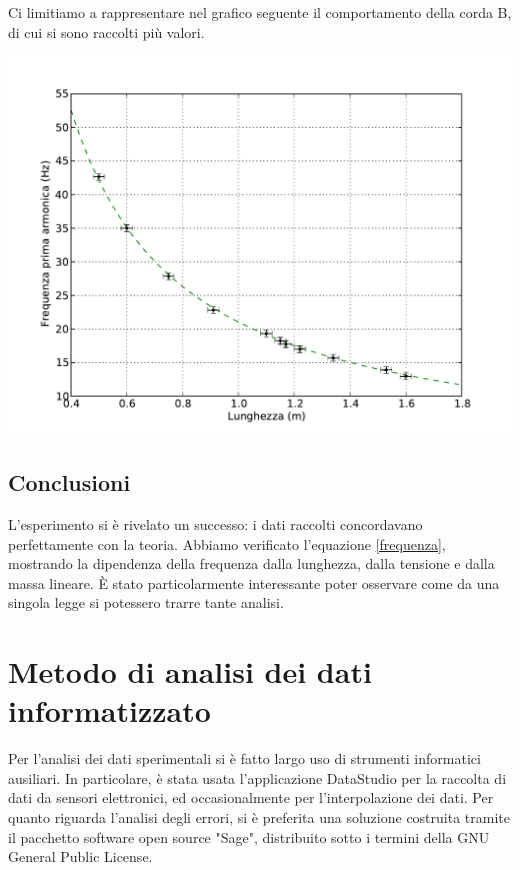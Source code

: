 Ci limitiamo a rappresentare nel grafico seguente il comportamento della corda B, di cui si sono raccolti più valori.

\begin{center}
\includegraphics[scale=0.75]{"../grafici/CordaPrimaArmonica"}
\end{center}

\section{Conclusioni}

L'esperimento si è rivelato un successo: i dati raccolti concordavano perfettamente con la teoria. Abbiamo verificato l'equazione \ref{frequenza}, mostrando la dipendenza della frequenza dalla lunghezza, dalla tensione e dalla massa lineare. È stato particolarmente interessante poter osservare come da una singola legge si potessero trarre tante analisi.




\addappheadtotoc
\appendix{}
\chapter{Metodo di analisi dei dati informatizzato}
Per l'analisi dei dati sperimentali si è fatto largo uso di strumenti informatici ausiliari.
In particolare, è stata usata l'applicazione DataStudio per la raccolta di dati da sensori elettronici, ed occasionalmente per l'interpolazione dei dati.
Per quanto riguarda l'analisi degli errori, si è preferita una soluzione costruita tramite il pacchetto software open source "Sage", distribuito sotto i termini della GNU General Public License.


